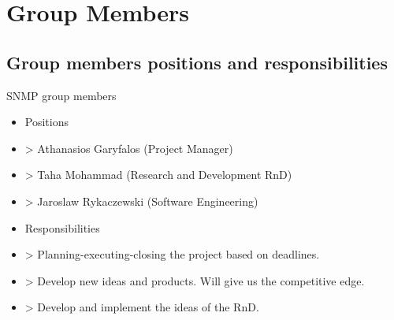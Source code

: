 \section{Group Members}
\label{sec:group}

\subsection{Group members positions and responsibilities}
  
\begin{frame}
  \begin{exampleblock}{SNMP group members}
    \begin{itemize}
      \item Positions
      \item<1-| alert@1>> Athanasios Garyfalos (\alert{Project Manager})
      \item<2-| alert@2>> Taha Mohammad (\alert{Research and Development RnD})
      \item<3-| alert@3>> Jaroslaw Rykaczewski (\alert{Software Engineering})
      \item Responsibilities
      \item<1-| alert@1>> Planning-executing-closing the project based on deadlines.
      \item<2-| alert@2>> Develop new ideas and products. Will give us the competitive edge.
      \item<3-| alert@3>> Develop and implement the ideas of the RnD.
    \end{itemize}
  \end{exampleblock}
\end{frame}
